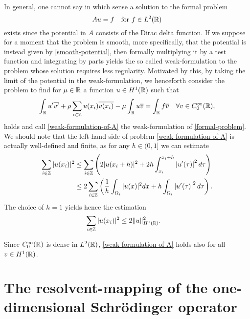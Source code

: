 In general, one cannot say in which sense a solution to the formal problem 
	\begin{equation}
		Au = f \quad \text{for } f \in L^{2}(\mathbb{R}) \label{formal-problem}
	\end{equation}
	exists since the potential in $A$ consists of the Dirac delta function. If we suppose for a moment that the problem is smooth, more specifically, that the potential is instead given by \eqref{smooth-potential}, then formally multiplying it by a test function and integrating by parts yields the so called weak-formulation to the problem whose solution requires less regularity. Motivated by this, by taking the limit of the potential in the weak-formulation, we henceforth consider the problem to find for $\mu \in \mathbb{R}$ a function $u \in H^{1}(\mathbb{R})$ such that  %
\begin{equation}
	\int_{\mathbb{R}} u' \overline{v'} + \rho \sum_{i \in \mathbb{Z}} u(x_{i}) \overline{v(x_{i})} - \mu \int_{\mathbb{R}} u \overline{v} = \int_{\mathbb{R}} f \overline{v} \quad \forall v \in C_{0}^{\infty}(\mathbb{R}), \label{weak-formulation-of-A}
\end{equation}	
holds and call \eqref{weak-formulation-of-A} the weak-formulation of \eqref{formal-problem}. We should note that the left-hand side of problem \eqref{weak-formulation-of-A} is actually well-defined and finite, as for any $h \in (0, 1]$ we can estimate
\begin{align}
	\sum_{i \in \mathbb{Z}} |u(x_{i})|^{2} & \leq \sum_{i \in \mathbb{Z}} \left( 2 |u( x_{i} + h )|^{2} +  2 h \int_{x_{i}}^{x_{i} + h} \left| u'(\tau) \right|^{2} d\tau \right) \notag \\
		 & \leq 2 \sum_{i \in \mathbb{Z}} \left( \frac{1}{h} \int_{\Omega_{i}} |u( x )|^{2} dx + h \int_{\Omega_{i}} \left| u'(\tau) \right|^{2} d\tau \right). \label{preestimation-for-potential}
\end{align}
The choice of $h = 1$ yields hence the estimation
\begin{align} 
		\sum_{i \in \mathbb{Z}} |u(x_{i})|^{2} & \leq 2 \| u \|^{2}_{H^{1}(\mathbb{R})}. \label{estimation-for-potential}
\end{align}

\begin{remark}
	Since $C_{0}^{\infty}(\mathbb{R})$ is dense in $L^{2}(\mathbb{R})$, \eqref{weak-formulation-of-A} holds also for all $v \in H^{1}(\mathbb{R})$.
\end{remark}

\section{The resolvent-mapping of the one-dimensional Schrödinger operator} \label{section:3.1}

